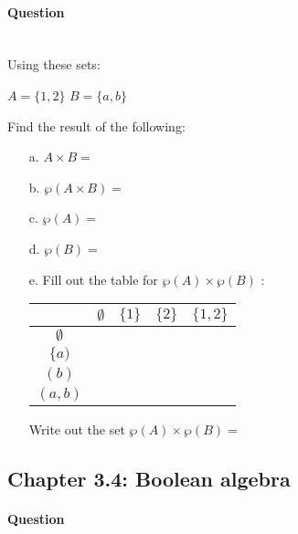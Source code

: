 \documentclass[a4paper,12pt]{book} \usepackage[utf8]{inputenc} \title{} \author{Rachel Morris} \date{\today}
\newcounter{question}
\begin{document}
    \paragraph{Question \thequestion} ~\\

Using these sets:

            \begin{center}
                $A = \{ 1, 2 \}$ \tab $B = \{ a, b \}$
            \end{center}

        Find the result of the following:

        \begin{enumerate}
            \item[a.]   $A \times B = $
            \item[b.]   $\wp( A \times B ) = $
            \item[c.]   $\wp(A) = $
            \item[d.]   $\wp(B) = $
            \item[e.]   Fill out the table for $\wp(A) \times \wp(B)$ :

                \begin{tabular}{ c | p{2.5cm} | p{2.5cm} | p{2.5cm} | p{2.5cm} }
                    & $\emptyset$ & $\{1\}$ & $\{2\}$ & $\{1, 2\}$
                    \\ \hline
                    $\emptyset$ & & & &
                    \\ \hline
                    $\{a)$ & & & &
                    \\ \hline
                    $(b)$ & & & &
                    \\ \hline
                    $(a, b)$ & & & &
                    \\
                \end{tabular}

                Write out the set $\wp(A) \times \wp(B) = $
        \end{enumerate}



    \subsection*{Chapter 3.4: Boolean algebra}

    \paragraph{Question \thequestion} ~\\
\end{document}
